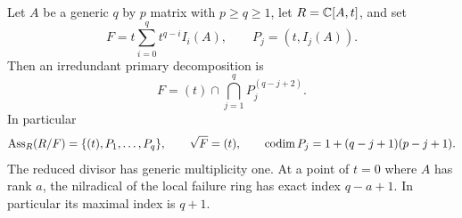 \begin{theorem}
\label{thm:weighted-primary}
Let $A$ be a generic $q$ by $p$ matrix with $p\ge q\ge1$,
let $R=\mathbb C[A,t]$, and set
\[
 F=t\sum_{i=0}^q t^{q-i}I_i(A),\qquad P_j=(t,I_j(A)).
\]
Then an irredundant primary decomposition is
\begin{equation}\label{eq:weighted-primary}
 F=(t)\cap\bigcap_{j=1}^q P_j^{(q-j+2)}.
\end{equation}
In particular
\[
 \operatorname{Ass}_R(R/F)=\{(t),P_1,\ldots,P_q\},\qquad
 \sqrt F=(t),\qquad
 \operatorname{codim} P_j=1+(q-j+1)(p-j+1).
\]
The reduced divisor has generic multiplicity one. At a point of
$t=0$ where $A$ has rank $a$, the nilradical of the local failure
ring has exact index $q-a+1$. In particular its maximal index is
$q+1$.
\end{theorem}
